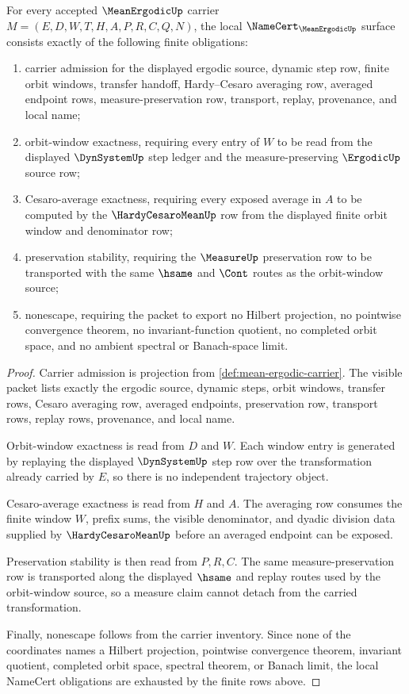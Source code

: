 \begin{theorem}
\label{thm:mean-ergodic-namecert-obligations}
For every accepted $\MeanErgodicUp$ carrier $M=(E,D,W,T,H,A,P,R,C,Q,N)$, the local $\NameCert_{\MeanErgodicUp}$ surface consists exactly of the following finite obligations:
\begin{enumerate}
\item carrier admission for the displayed ergodic source, dynamic step row, finite orbit windows, transfer handoff, Hardy--Cesaro averaging row, averaged endpoint rows, measure-preservation row, transport, replay, provenance, and local name;
\item orbit-window exactness, requiring every entry of $W$ to be read from the displayed $\DynSystemUp$ step ledger and the measure-preserving $\ErgodicUp$ source row;
\item Cesaro-average exactness, requiring every exposed average in $A$ to be computed by the $\HardyCesaroMeanUp$ row from the displayed finite orbit window and denominator row;
\item preservation stability, requiring the $\MeasureUp$ preservation row to be transported with the same $\hsame$ and $\Cont$ routes as the orbit-window source;
\item nonescape, requiring the packet to export no Hilbert projection, no pointwise convergence theorem, no invariant-function quotient, no completed orbit space, and no ambient spectral or Banach-space limit.
\end{enumerate}
\end{theorem}
\begin{proof}
Carrier admission is projection from \autoref{def:mean-ergodic-carrier}. The visible packet lists exactly the ergodic source, dynamic steps, orbit windows, transfer rows, Cesaro averaging row, averaged endpoints, preservation row, transport rows, replay rows, provenance, and local name.

Orbit-window exactness is read from $D$ and $W$. Each window entry is generated by replaying the displayed $\DynSystemUp$ step row over the transformation already carried by $E$, so there is no independent trajectory object.

Cesaro-average exactness is read from $H$ and $A$. The averaging row consumes the finite window $W$, prefix sums, the visible denominator, and dyadic division data supplied by $\HardyCesaroMeanUp$ before an averaged endpoint can be exposed.

Preservation stability is then read from $P,R,C$. The same measure-preservation row is transported along the displayed $\hsame$ and replay routes used by the orbit-window source, so a measure claim cannot detach from the carried transformation.

Finally, nonescape follows from the carrier inventory. Since none of the coordinates names a Hilbert projection, pointwise convergence theorem, invariant quotient, completed orbit space, spectral theorem, or Banach limit, the local NameCert obligations are exhausted by the finite rows above.
\end{proof}


